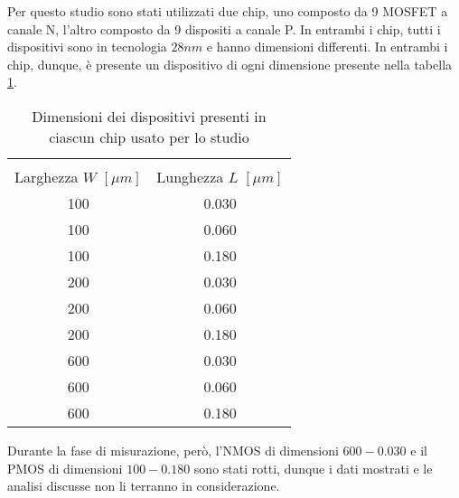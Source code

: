 Per questo studio sono stati utilizzati due chip, uno composto da 9 MOSFET a canale N, l'altro composto da 9 dispositi a canale P. In entrambi i chip, tutti i dispositivi sono in tecnologia $28 nm$ e hanno dimensioni differenti. In entrambi i chip, dunque, è presente un dispositivo di ogni dimensione presente nella tabella \ref{tab:dimensioniMOSFET}.

\begin{table}[ht]
  \renewcommand{\arraystretch}{1.3}
  \centering
    \begin{tabular}{c c }
      \toprule \\
          Larghezza $W$ $[\mu m]$ & Lunghezza $L$ $[\mu m]$ \\
     \midrule
	   100 & 0.030 \\
	\hline
	   100 & 0.060 \\
	\hline
	   100 & 0.180 \\
	\hline
	   200 & 0.030 \\
 	\hline
	   200 & 0.060 \\
	\hline
	   200 & 0.180 \\
	\hline
 	   600 & 0.030 \\
	\hline
	   600 & 0.060 \\
	\hline
	   600 & 0.180 \\
      \bottomrule
    \end{tabular}
 
  \caption{Dimensioni dei dispositivi presenti in ciascun chip usato per lo studio}
  \label{tab:dimensioniMOSFET}
\end{table}

Durante la fase di misurazione, però, l'NMOS di dimensioni $600-0.030$ e il PMOS di dimensioni $100-0.180$ sono stati rotti, dunque i dati mostrati e le analisi discusse non li terranno in considerazione.


